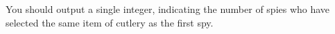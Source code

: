 You should output a single integer, indicating the number of spies who have selected the same item of cutlery as the first spy.
